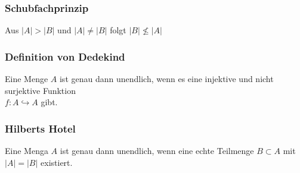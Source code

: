\subsubsection{Schubfachprinzip}
Aus $|A| > |B|$ und $|A| \neq |B|$ folgt $|B| \not\leq |A|$
\subsubsection{Definition von Dedekind}
Eine Menge $A$ ist genau dann unendlich, wenn es eine injektive und nicht surjektive Funktion
\\$f: A \hookrightarrow A$ gibt.
	\subsubsection{Hilberts Hotel}
	Eine Menga $A$ ist genau dann unendlich, wenn eine echte Teilmenge $B \subset A$ mit $|A| = |B|$ existiert.
